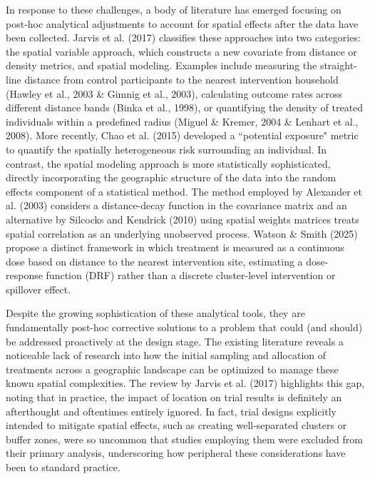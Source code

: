 \documentclass{article}[11pt]
\begin{document}
In response to these challenges, a body of literature has emerged focusing on post-hoc analytical adjustments to account for spatial effects after the data have been collected. Jarvis et al. (2017) classifies these approaches into two categories: the spatial variable approach, which constructs a new covariate from distance or density metrics, and spatial modeling\cite{jarvis_spatial_2017}. Examples include measuring the straight-line distance from control participants to the nearest intervention household (Hawley et al., 2003 \& Gimnig et al., 2003)\cite{hawley_community-wide_2003}\cite{gimnig_effect_2003}, calculating outcome rates across different distance bands (Binka et al., 1998)\cite{binka_impact_1998}, or quantifying the density of treated individuals within a predefined radius (Miguel \& Kremer, 2004 \& Lenhart et al., 2008)\cite{miguel_worms_2004}\cite{lenhart_insecticidetreated_2008}. More recently, Chao et al. (2015) developed a ``potential exposure" metric to quantify the spatially heterogeneous risk surrounding an individual\cite{chao_contribution_2015}. In contrast, the spatial modeling approach is more statistically sophisticated, directly incorporating the geographic structure of the data into the random effects component of a statistical method. The method employed by Alexander et al. (2003)\cite{alexander_spatial_2003} considers a distance-decay function in the covariance matrix and an alternative by Silcocks and Kendrick (2010)\cite{silcocks_spatial_2010} using spatial weights matrices treats spatial correlation as an underlying unobserved process. 
Watson \& Smith (2025) propose a distinct framework in which treatment is measured as a continuous dose based on distance to the nearest intervention site, estimating a dose-response function (DRF) rather than a discrete cluster-level intervention or spillover effect\cite{watson_design_2025}.

Despite the growing sophistication of these analytical tools, they are fundamentally post-hoc corrective solutions to a problem that could (and should) be addressed proactively at the design stage. The existing literature reveals a noticeable lack of research into how the initial sampling and allocation of treatments across a geographic landscape can be optimized to manage these known spatial complexities. The review by Jarvis et al. (2017) highlights this gap, noting that in practice, the impact of location on trial results is definitely an afterthought and oftentimes entirely ignored\cite{jarvis_spatial_2017}. In fact, trial designs explicitly intended to mitigate spatial effects, such as creating well-separated clusters or buffer zones, were so uncommon that studies employing them were excluded from their primary analysis, underscoring how peripheral these considerations have been to standard practice\cite{jarvis_spatial_2017}. 
\end{document}

